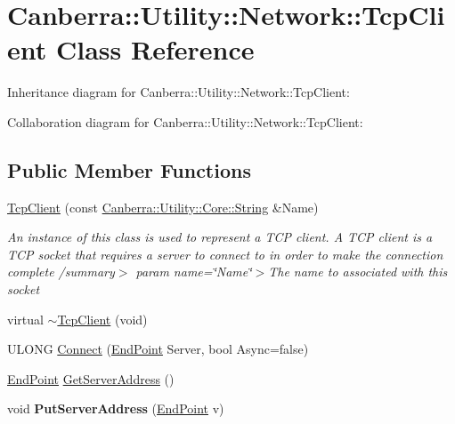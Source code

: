 \hypertarget{class_canberra_1_1_utility_1_1_network_1_1_tcp_client}{}\section{Canberra\+:\+:Utility\+:\+:Network\+:\+:Tcp\+Client Class Reference}
\label{class_canberra_1_1_utility_1_1_network_1_1_tcp_client}


Inheritance diagram for Canberra\+:\+:Utility\+:\+:Network\+:\+:Tcp\+Client\+:


Collaboration diagram for Canberra\+:\+:Utility\+:\+:Network\+:\+:Tcp\+Client\+:
\subsection*{Public Member Functions}
\begin{DoxyCompactItemize}
\item 
\mbox{\label{class_canberra_1_1_utility_1_1_network_1_1_tcp_client_af0e4afad0f5cd6840ea940ac664c79d4}} 
\hyperlink{class_canberra_1_1_utility_1_1_network_1_1_tcp_client_af0e4afad0f5cd6840ea940ac664c79d4}{Tcp\+Client} (const \hyperlink{class_canberra_1_1_utility_1_1_core_1_1_string}{Canberra\+::\+Utility\+::\+Core\+::\+String} \&Name)
\begin{DoxyCompactList}\small\item\em An instance of this class is used to represent a T\+CP client. A T\+CP client is a T\+CP socket that requires a server to connect to in order to make the connection complete /summary$>$ param name=\char`\"{}\+Name\char`\"{}$>$The name to associated with this socket\end{DoxyCompactList}\item 
virtual \hyperlink{class_canberra_1_1_utility_1_1_network_1_1_tcp_client_a2ecff6b14fa721d16b4ef8dcb3a1dd64_a2ecff6b14fa721d16b4ef8dcb3a1dd64}{$\sim$\+Tcp\+Client} (void)
\item 
U\+L\+O\+NG \hyperlink{class_canberra_1_1_utility_1_1_network_1_1_tcp_client_a4105885041a405512c99fe6864cb054f_a4105885041a405512c99fe6864cb054f}{Connect} (\hyperlink{class_canberra_1_1_utility_1_1_network_1_1_end_point}{End\+Point} Server, bool Async=false)
\item 
\hyperlink{class_canberra_1_1_utility_1_1_network_1_1_end_point}{End\+Point} \hyperlink{class_canberra_1_1_utility_1_1_network_1_1_tcp_client_a068376947fe5eaf838713d3f1283223e_a068376947fe5eaf838713d3f1283223e}{Get\+Server\+Address} ()
\item 
\mbox{\label{class_canberra_1_1_utility_1_1_network_1_1_tcp_client_abae2cbd9dfba234fc4baef409f34ef9a}} 
void {\bfseries Put\+Server\+Address} (\hyperlink{class_canberra_1_1_utility_1_1_network_1_1_end_point}{End\+Point} v)
\end{DoxyCompactItemize}

